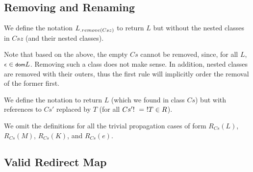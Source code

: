 \subsection{Removing and Renaming}

We define the notation $L{{}_{.{remove}({Csz})}}$ to return $L$ but without the nested classes in $Csz$ (and their nested classes).

\begin{defs}
\end{defs}

Note that based on the above, the empty $Cs$ cannot be removed, since, for all $L$, $\Empty \in \dom{L}$. Removing such a class does not make sense. In addition, nested classes are removed with their outers, thus the first rule will implicitly order the removal of the former first.

We define the notation  to return $L$ (which we found in class $Cs$) but with references to $Cs'$ replaced by $T$ (for all $\redm{Cs'}{T} \in R$). 

\begin{defs}
\end{defs}

We omit the definitions for all the trivial propagation cases of form $R_{Cs}(L)$, $R_{Cs}(M)$, $R_{Cs}(K)$, and $R_{Cs}(e)$.

\subsection{Valid Redirect Map}


